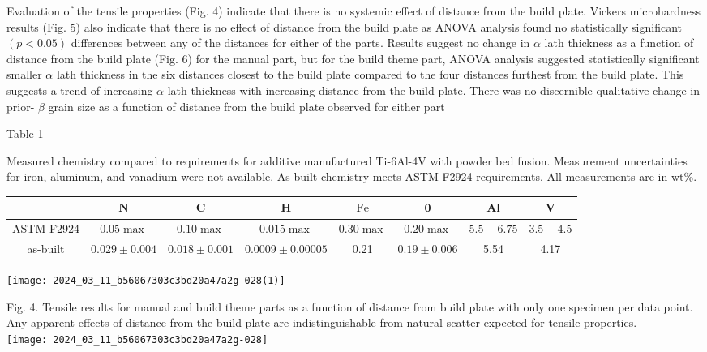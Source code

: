 \documentclass[10pt]{article}
\begin{document}
Evaluation of the tensile properties (Fig. 4) indicate that there is no systemic effect of distance from the build plate. Vickers microhardness results (Fig. 5) also indicate that there is no effect of distance from the build plate as ANOVA analysis found no statistically significant $(p<0.05)$ differences between any of the distances for either of the parts. Results suggest no change in $\alpha$ lath thickness as a function of distance from the build plate (Fig. 6) for the manual part, but for the build theme part, ANOVA analysis suggested statistically significant smaller $\alpha$ lath thickness in the six distances closest to the build plate compared to the four distances furthest from the build plate. This suggests a trend of increasing $\alpha$ lath thickness with increasing distance from the build plate. There was no discernible qualitative change in prior- $\beta$ grain size as a function of distance from the build plate observed for either part

Table 1

Measured chemistry compared to requirements for additive manufactured Ti-6Al-4V with powder bed fusion. Measurement uncertainties for iron, aluminum, and vanadium were not available. As-built chemistry meets ASTM F2924 requirements. All measurements are in wt\%.

\begin{center}
\begin{tabular}{|c|c|c|c|c|c|c|c|}
\hline
 & $\mathbf{N}$ & C & $\mathbf{H}$ & $\mathrm{Fe}$ & $\mathbf{0}$ & Al & $\mathbf{V}$ \\
\hline
ASTM F2924 & $0.05 \max$ & $0.10 \max$ & $0.015 \max$ & $0.30 \max$ & $0.20 \max$ & $5.5-6.75$ & $3.5-4.5$ \\
\hline
as-built & $0.029 \pm 0.004$ & $0.018 \pm 0.001$ & $0.0009 \pm 0.00005$ & 0.21 & $0.19 \pm 0.006$ & 5.54 & 4.17 \\
\hline
\end{tabular}
\end{center}

\begin{center}
\texttt{[image: 2024\_03\_11\_b56067303c3bd20a47a2g-028(1)]}
\end{center}

Fig. 4. Tensile results for manual and build theme parts as a function of distance from build plate with only one specimen per data point. Any apparent effects of distance from the build plate are indistinguishable from natural scatter expected for tensile properties.\\
\texttt{[image: 2024\_03\_11\_b56067303c3bd20a47a2g-028]}
\end{document}
